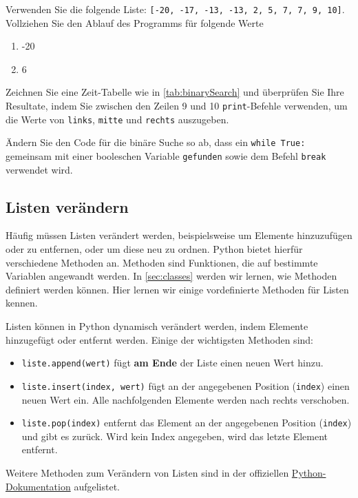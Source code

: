 \begin{myexercise}
	Verwenden Sie die folgende Liste: \lstinline|[-20, -17, -13, -13, 2, 5, 7, 7, 9, 10]|. Vollziehen Sie den Ablauf des Programms für folgende Werte
	\begin{enumerate}
		\item -20
		\item 6
	\end{enumerate}
	Zeichnen Sie eine Zeit-Tabelle wie in \cref{tab:binarySearch} und überprüfen Sie Ihre Resultate, indem Sie zwischen den Zeilen 9 und 10 \lstinline|print|-Befehle verwenden, um die Werte von \lstinline|links|, \lstinline|mitte| und \lstinline|rechts| auszugeben.
\end{myexercise}

\begin{myexercise}
	Ändern Sie den Code für die binäre Suche so ab, dass ein \lstinline|while True:| gemeinsam mit einer booleschen Variable \lstinline|gefunden| sowie dem Befehl \lstinline|break| verwendet wird.
	\begin{myanswer}
		
	\end{myanswer}
\end{myexercise}


\subsection{Listen verändern}

Häufig müssen Listen verändert werden, beispielsweise um Elemente hinzuzufügen oder zu entfernen, oder um diese neu zu ordnen. Python bietet hierfür verschiedene Methoden an. Methoden sind Funktionen, die auf bestimmte Variablen angewandt werden. In \ref{sec:classes} werden wir lernen, wie Methoden definiert werden können. Hier lernen wir einige vordefinierte Methoden für Listen kennen.

\begin{mydefinition}
	Listen können in Python dynamisch verändert werden, indem Elemente hinzugefügt oder entfernt werden. Einige der wichtigsten Methoden sind:
	\begin{itemize}
		\item \lstinline|liste.append(wert)| fügt \textbf{am Ende} der Liste einen neuen Wert hinzu.
		\item \lstinline|liste.insert(index, wert)| fügt an der angegebenen Position (\texttt{index}) einen neuen Wert ein. Alle nachfolgenden Elemente werden nach rechts verschoben.
		\item \lstinline|liste.pop(index)| entfernt das Element an der angegebenen Position (\texttt{index}) und gibt es zurück. Wird kein Index angegeben, wird das letzte Element entfernt.
	\end{itemize}
	Weitere Methoden zum Verändern von Listen sind in der offiziellen \href{https://docs.python.org/3/tutorial/datastructures.html#more-on-lists}{Python-Dokumentation} aufgelistet.
\end{mydefinition}


